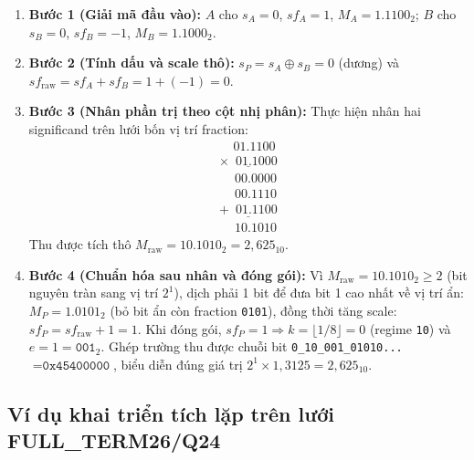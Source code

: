 \begin{enumerate}
  \item \textbf{Bước 1 (Giải mã đầu vào):}
        $A$ cho $s_A = 0$, $sf_A = 1$, $M_A = 1.1100_2$;
        $B$ cho $s_B = 0$, $sf_B = -1$, $M_B = 1.1000_2$.
  \item \textbf{Bước 2 (Tính dấu và scale thô):}
        $s_P = s_A \oplus s_B = 0$ (dương) và $sf_{\mathrm{raw}} = sf_A + sf_B = 1 + (-1) = 0$.
  \item \textbf{Bước 3 (Nhân phần trị theo cột nhị phân):}
        Thực hiện nhân hai significand trên lưới bốn vị trí fraction:
        \[
        \begin{array}{r}
          \phantom{\times}01.1100\\
          \underline{\times\phantom{0}01.1000}\\
          \phantom{+}00.0000\\
          \phantom{+}00.1110\\
          \underline{+\phantom{0}01.1100}\\
          \phantom{+}10.1010
        \end{array}
        \]
        Thu được tích thô $M_{\mathrm{raw}} = 10.1010_2 = 2{,}625_{10}$.
  \item \textbf{Bước 4 (Chuẩn hóa sau nhân và đóng gói):}
        Vì $M_{\mathrm{raw}} = 10.1010_2 \ge 2$ (bit nguyên tràn sang vị trí $2^1$),
        dịch phải 1 bit để đưa bit 1 cao nhất về vị trí ẩn: $M_P = 1.0101_2$ (bỏ bit
        ẩn còn fraction \texttt{0101}), đồng thời tăng scale: $sf_P = sf_{\mathrm{raw}} + 1 = 1$.
        Khi đóng gói, $sf_P = 1 \Rightarrow k = \lfloor 1/8 \rfloor = 0$ (regime
        \texttt{10}) và $e = 1 = \texttt{001}_2$. Ghép trường thu được chuỗi bit
        \texttt{0\_10\_001\_01010...} $= \texttt{0x45400000}$, biểu diễn đúng giá
        trị $2^1 \times 1{,}3125 = 2{,}625_{10}$.
\end{enumerate}

\subsection{Ví dụ khai triển tích lặp trên lưới FULL\_TERM26/Q24}

